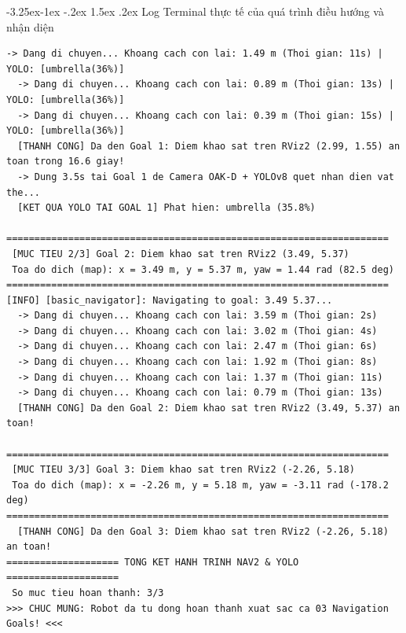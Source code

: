 \documentclass[11pt,a4paper]{article}
\makeatletter
\renewcommand{\subsection}{\@startsection{subsection}{2}{\z@}%
  {-3.25ex\@plus -1ex \@minus -.2ex}%
  {1.5ex \@plus .2ex}%
  {\normalfont\normalsize\bfseries\color{secondary}}}
\makeatother
\begin{document}
\subsection{Log Terminal thực tế của quá trình điều hướng và nhận diện}
\begin{lstlisting}[backgroundcolor=\color{logbg}, caption={Log terminal thực tế khi robot hoàn thành Goal 1 và tự động chuyển sang Goal 2}]
  -> Dang di chuyen... Khoang cach con lai: 1.49 m (Thoi gian: 11s) | YOLO: [umbrella(36%)]
  -> Dang di chuyen... Khoang cach con lai: 0.89 m (Thoi gian: 13s) | YOLO: [umbrella(36%)]
  -> Dang di chuyen... Khoang cach con lai: 0.39 m (Thoi gian: 15s) | YOLO: [umbrella(36%)]
  [THANH CONG] Da den Goal 1: Diem khao sat tren RViz2 (2.99, 1.55) an toan trong 16.6 giay!
  -> Dung 3.5s tai Goal 1 de Camera OAK-D + YOLOv8 quet nhan dien vat the...
  [KET QUA YOLO TAI GOAL 1] Phat hien: umbrella (35.8%)

====================================================================
 [MUC TIEU 2/3] Goal 2: Diem khao sat tren RViz2 (3.49, 5.37)
 Toa do dich (map): x = 3.49 m, y = 5.37 m, yaw = 1.44 rad (82.5 deg)
====================================================================
[INFO] [basic_navigator]: Navigating to goal: 3.49 5.37...
  -> Dang di chuyen... Khoang cach con lai: 3.59 m (Thoi gian: 2s)
  -> Dang di chuyen... Khoang cach con lai: 3.02 m (Thoi gian: 4s)
  -> Dang di chuyen... Khoang cach con lai: 2.47 m (Thoi gian: 6s)
  -> Dang di chuyen... Khoang cach con lai: 1.92 m (Thoi gian: 8s)
  -> Dang di chuyen... Khoang cach con lai: 1.37 m (Thoi gian: 11s)
  -> Dang di chuyen... Khoang cach con lai: 0.79 m (Thoi gian: 13s)
  [THANH CONG] Da den Goal 2: Diem khao sat tren RViz2 (3.49, 5.37) an toan!

====================================================================
 [MUC TIEU 3/3] Goal 3: Diem khao sat tren RViz2 (-2.26, 5.18)
 Toa do dich (map): x = -2.26 m, y = 5.18 m, yaw = -3.11 rad (-178.2 deg)
====================================================================
  [THANH CONG] Da den Goal 3: Diem khao sat tren RViz2 (-2.26, 5.18) an toan!
==================== TONG KET HANH TRINH NAV2 & YOLO ====================
 So muc tieu hoan thanh: 3/3
>>> CHUC MUNG: Robot da tu dong hoan thanh xuat sac ca 03 Navigation Goals! <<<
\end{lstlisting}

\end{document}
